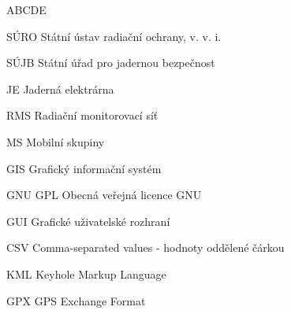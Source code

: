 
\begin{seznamzkratek}{ABCDE}
	
	      {SÚRO}
	      {Státní ústav radiační ochrany, v. v. i.}

	      {SÚJB}
	      {Státní úřad pro jadernou bezpečnost}
	      
		  {JE}
		  {Jaderná elektrárna}
	      
		  {RMS}
		  {Radiační monitorovací síť}
		  
		  {MS}
		  {Mobilní skupiny}

		  {GIS}
		  {Grafický informační systém}	
	
	      {GNU GPL}
	      {Obecná veřejná licence GNU}
	     
		  {GUI}
		  {Grafické uživatelské rozhraní}

		  {CSV}
		  {Comma-separated values - hodnoty oddělené čárkou}
		  
		  {KML}
		  {Keyhole Markup Language}
		  
		  {GPX}
		  {GPS Exchange Format}
		  
\end{seznamzkratek}